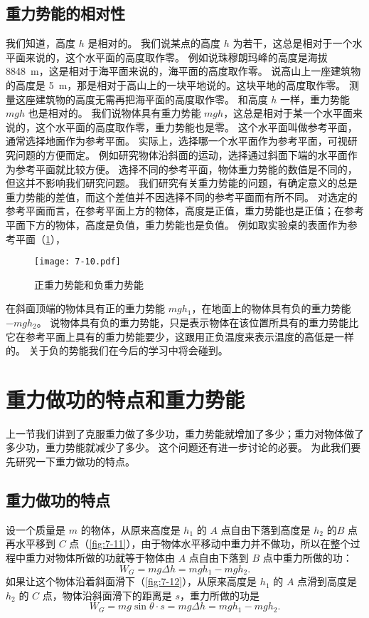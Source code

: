 \subsection{重力势能的相对性}
我们知道，高度 $h$ 是相对的。
我们说某点的高度 $h$ 为若干，这总是相对于一个水平面来说的，这个水平面的高度取作零。
例如说珠穆朗玛峰的高度是海拔 \qty{8848}{m}，这是相对于海平面来说的，海平面的高度取作零。
说高山上一座建筑物的高度是 \qty{5}{m}，那是相对于高山上的一块平地说的。这块平地的高度取作零。
测量这座建筑物的高度无需再把海平面的高度取作零。
和高度 $h$ 一样，重力势能 $mgh$ 也是相对的。
我们说物体具有重力势能 $mgh$，这总是相对于某一个水平面来说的，这个水平面的高度取作零，重力势能也是零。
这个水平面叫做参考平面，通常选择地面作为参考平面。
实际上，选择哪一个水平面作为参考平面，可视研究问题的方便而定。
例如研究物体沿斜面的运动，选择通过斜面下端的水平面作为参考平面就比较方便。
选择不同的参考平面，物体重力势能的数值是不同的，但这并不影响我们研究问题。
我们研究有关重力势能的问题，有确定意义的总是重力势能的差值，而这个差值并不因选择不同的参考平面而有所不同。
对选定的参考平面而言，在参考平面上方的物体，高度是正值，重力势能也是正值；在参考平面下方的物体，高度是负值，重力势能也是负值。
例如取实验桌的表面作为参考平面（\cref{fig:7-10}），
\begin{figure}
  \texttt{[image: 7-10.pdf]}
  \caption{正重力势能和负重力势能}\label{fig:7-10}
\end{figure}
在斜面顶端的物体具有正的重力势能 $mgh_1$，在地面上的物体具有负的重力势能 $-mgh_2$。
说物体具有负的重力势能，只是表示物体在该位置所具有的重力势能比它在参考平面上具有的重力势能要少，这跟用正负温度来表示温度的高低是一样的。
关于负的势能我们在今后的学习中将会碰到。

\section{重力做功的特点和重力势能}
上一节我们讲到了克服重力做了多少功，重力势能就增加了多少；重力对物体做了多少功，重力势能就减少了多少。
这个问题还有进一步讨论的必要。
为此我们要先研究一下重力做功的特点。

\subsection{重力做功的特点}
设一个质量是 $m$ 的物体，从原来高度是 $h_1$ 的 $A$ 点自由下落到高度是 $h_2$ 的$B$ 点再水平移到 $C$ 点（\cref{fig:7-11}），由于物体水平移动中重力并不做功，所以在整个过程中重力对物体所做的功就等于物体由 $A$ 点自由下落到 $B$ 点中重力所做的功：
\[W_G=mg\Delta h=mgh_1-mgh_2.\]
如果让这个物体沿着斜面滑下（\cref{fig:7-12}），从原来高度是 $h_1$ 的 $A$ 点滑到高度是 $h_2$ 的 $C$ 点，物体沿斜面滑下的距离是 $s$，重力所做的功是
\[W_G=mg\sin\theta \cdot s=mg\Delta h=mgh_1-mgh_2.\]

